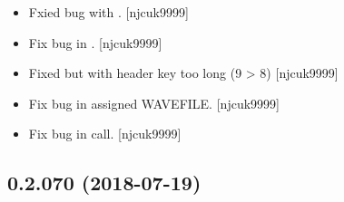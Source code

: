 \documentclass[a4paper,10pt,english]{report}
\begin{document}
\begin{itemize}
\item {} 
Fxied bug with . {[}njcuk9999{]}

\item {} 
Fix bug in . {[}njcuk9999{]}

\item {} 
Fixed but with header key too long (9 \textgreater{} 8) {[}njcuk9999{]}

\item {} 
Fix bug in assigned WAVEFILE. {[}njcuk9999{]}

\item {} 
Fix bug in  call. {[}njcuk9999{]}

\end{itemize}


\subsection{0.2.070 (2018-07-19)}
\end{document}
